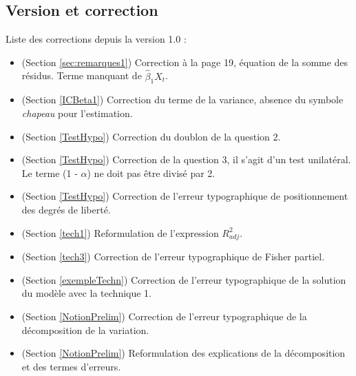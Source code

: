 \subsection*{Version et correction}
Liste des corrections depuis la version 1.0 :
\begin{itemize}
\item (Section \ref{sec:remarques1}) Correction à la page 19, équation de la somme des résidus. Terme manquant de $\hat{\beta}_1 X_t$.
\item (Section \ref{ICBeta1}) Correction du terme de la variance, absence du symbole \emph{chapeau} pour l'estimation. 
\item (Section \ref{TestHypo}) Correction du doublon de la question 2.
\item (Section \ref{TestHypo}) Correction de la question 3, il s'agit d'un test unilatéral. Le terme (1 - $\alpha$) ne doit pas être divisé par 2. 
\item (Section \ref{TestHypo}) Correction de l'erreur typographique de positionnement des degrés de liberté.
\item (Section \ref{tech1}) Reformulation de l'expression $R^2_{adj}$.
\item (Section \ref{tech3}) Correction de l'erreur typographique de Fisher partiel.
\item (Section \ref{exempleTechn}) Correction de l'erreur typographique de la solution du modèle avec la technique 1.
\item (Section \ref{NotionPrelim}) Correction de l'erreur typographique de la décomposition de la variation.
\item (Section \ref{NotionPrelim}) Reformulation des explications de la décomposition et des termes d'erreurs.
\end{itemize}
